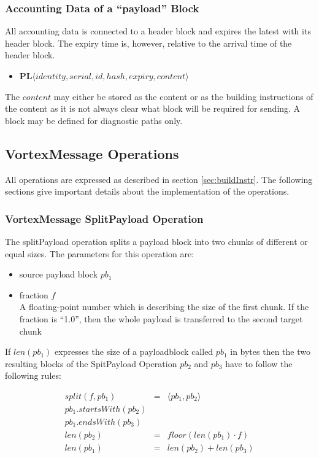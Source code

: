 \subsubsection{Accounting Data of a ``payload'' Block}
All accounting data is connected to a header block and expires the latest with its header block. The expiry time is, however, relative to the arrival time of the header block.
\begin{itemize}
	\item $\mathbf{PL}\langle identity, serial, id, hash, expiry, content\rangle$\\
\end{itemize}

The $content$ may either be stored as the content or as the building instructions of the content as it is not always clear what block will be required for sending. A block may be defined for diagnostic paths only.

\subsection{VortexMessage Operations}
All operations are expressed as described in section \ref{sec:buildInstr}. The following sections give important details about the implementation of the operations.

\subsubsection{VortexMessage SplitPayload Operation}
The splitPayload operation splits a payload block into two chunks of different or equal sizes. The parameters for this operation are:

\begin{itemize}
	\item source payload block $pb_1$
	\item fraction $f$\\
	A floating-point number which is describing the size of the first chunk. If the fraction is ``1.0'', then the whole payload is transferred to the second target chunk
\end{itemize}

If $len(pb_1)$ expresses the size of a payloadblock called $pb_1$ in bytes then the two resulting blocks of the SpitPayload Operation $pb_2$ and $pb_3$ have to follow the following rules:

\begin{eqnarray}
split(f, pb_1) & = &\langle pb_1, pb_2 \rangle\\
pb_1.startsWith(pb_2)\\
pb_1.endsWith(pb_3)\\
len(pb_2) & = & floor(len(pb_1)\cdot f)\\
len(pb_1) & = & len(pb_2) + len(pb_3)
\end{eqnarray}

